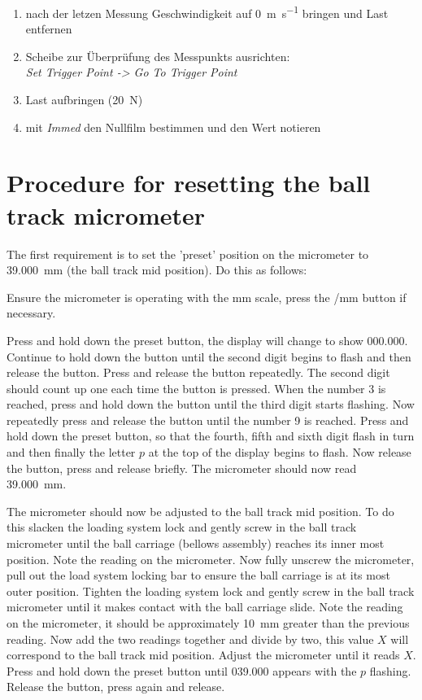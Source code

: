 \begin{appendices}
\begin{enumerate}
            \item nach der letzen Messung Geschwindigkeit auf \SI[per-mode=symbol]{0}{\meter\per\second} bringen und Last entfernen
            \item Scheibe zur Überprüfung des Messpunkts ausrichten: \\
                \textit{Set Trigger Point -> Go To Trigger Point}
            \item Last aufbringen (\SI{20}{\newton})
            \item mit \textit{Immed} den Nullfilm bestimmen und den Wert notieren
        \end{enumerate}

    \section{Procedure for resetting the ball track micrometer}

    The first requirement is to set the 'preset' position on the micrometer to \SI{39.000}{\milli\meter} (the ball track mid position). Do this as follows:

    Ensure the micrometer is operating with the \si{\mm} scale, press the \si[per-mode=symbol]{\inch\per\mm} button if necessary.

    Press and hold down the preset button, the display will change to show \num{000.000}.
    Continue to hold down the button until the second digit begins to flash and then release the button.
    Press and release the button repeatedly.
    The second digit should count up one each time the button is pressed.
    When the number \num{3} is reached, press and hold down the button until the third digit starts flashing.
    Now repeatedly press and release the button until the number 9 is reached.
    Press and hold down the preset button, so that the fourth, fifth and sixth digit flash in turn and then finally the letter $p$ at the top of the display begins to flash.
    Now release the button, press and release briefly.
    The micrometer should now read \SI{39.000}{\mm}.

    The micrometer should now be adjusted to the ball track mid position.
    To do this slacken the loading system lock and gently screw in the ball track micrometer until the ball carriage (bellows assembly) reaches its inner most position.
    Note the reading on the micrometer.
    Now fully unscrew the micrometer, pull out the load system locking bar to ensure the ball carriage is at its most outer position.
    Tighten the loading system lock and gently screw in the ball track micrometer until it makes contact with the ball carriage slide.
    Note the reading on the micrometer, it should be approximately \SI{10}{\mm} greater than the previous reading.
    Now add the two readings together and divide by two, this value $X$ will correspond to the ball track mid position.
    Adjust the micrometer until it reads $X$.
    Press and hold down the preset button until \num{039.000} appears with the $p$ flashing.
    Release the button, press again and release.


\end{appendices}
